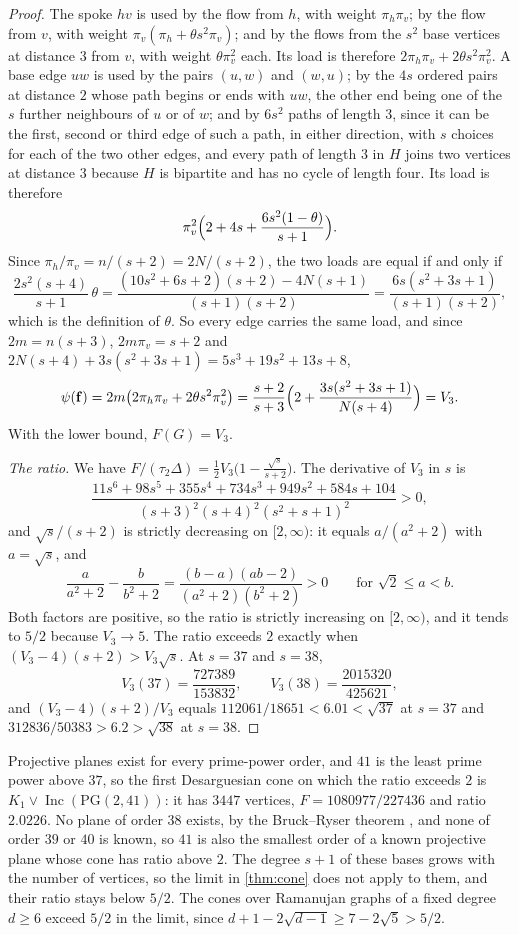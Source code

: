 \documentclass[11pt]{amsart}
\theoremstyle{definition}
\newcommand{\bfF}{\mathbf{f}}
\newcommand{\PG}{\mathrm{PG}}
\DeclareMathOperator{\Inc}{Inc}
\begin{document}
\begin{proof}
The spoke $hv$ is used by the flow from $h$, with weight $\pi_h\pi_v$; by the flow from $v$, with weight $\pi_v(\pi_h+\theta s^2\pi_v)$; and by the flows from the $s^2$ base vertices at distance $3$ from $v$, with weight $\theta\pi_v^2$ each. Its load is therefore $2\pi_h\pi_v+2\theta s^2\pi_v^2$. A base edge $uw$ is used by the pairs $(u,w)$ and $(w,u)$; by the $4s$ ordered pairs at distance $2$ whose path begins or ends with $uw$, the other end being one of the $s$ further neighbours of $u$ or of $w$; and by $6s^2$ paths of length $3$, since it can be the first, second or third edge of such a path, in either direction, with $s$ choices for each of the two other edges, and every path of length $3$ in $H$ joins two vertices at distance $3$ because $H$ is bipartite and has no cycle of length four. Its load is therefore
\[
\pi_v^2\Bigl(2+4s+\frac{6s^2(1-\theta)}{s+1}\Bigr).
\]
Since $\pi_h/\pi_v=n/(s+2)=2N/(s+2)$, the two loads are equal if and only if
\[
\frac{2s^2(s+4)}{s+1}\,\theta=\frac{(10s^2+6s+2)(s+2)-4N(s+1)}{(s+1)(s+2)}=\frac{6s(s^2+3s+1)}{(s+1)(s+2)},
\]
which is the definition of $\theta$. So every edge carries the same load, and since $2m=n(s+3)$, $2m\pi_v=s+2$ and $2N(s+4)+3s(s^2+3s+1)=5s^3+19s^2+13s+8$,
\[
\psi(\bfF)=2m\bigl(2\pi_h\pi_v+2\theta s^2\pi_v^2\bigr)=\frac{s+2}{s+3}\Bigl(2+\frac{3s(s^2+3s+1)}{N(s+4)}\Bigr)=V_3 .
\]
With the lower bound, $F(G)=V_3$.

\emph{The ratio.} We have $F/(\tau_2\Delta)=\frac12V_3\bigl(1-\frac{\sqrt s}{s+2}\bigr)$. The derivative of $V_3$ in $s$ is
\[
\frac{11s^6+98s^5+355s^4+734s^3+949s^2+584s+104}{(s+3)^2(s+4)^2(s^2+s+1)^2}>0,
\]
and $\sqrt s/(s+2)$ is strictly decreasing on $[2,\infty)$: it equals $a/(a^2+2)$ with $a=\sqrt s$, and
\[
\frac a{a^2+2}-\frac b{b^2+2}=\frac{(b-a)(ab-2)}{(a^2+2)(b^2+2)}>0\qquad\text{for }\sqrt2\le a<b .
\] Both factors are positive, so the ratio is strictly increasing on $[2,\infty)$, and it tends to $5/2$ because $V_3\to5$. The ratio exceeds $2$ exactly when $(V_3-4)(s+2)>V_3\sqrt s$. At $s=37$ and $s=38$,
\[
V_3(37)=\frac{727389}{153832},\qquad V_3(38)=\frac{2015320}{425621},
\]
and $(V_3-4)(s+2)/V_3$ equals $112061/18651<6.01<\sqrt{37}$ at $s=37$ and $312836/50383>6.2>\sqrt{38}$ at $s=38$.
\end{proof}

Projective planes exist for every prime-power order, and $41$ is the least prime power above $37$, so the first Desarguesian cone on which the ratio exceeds $2$ is $K_1\vee\Inc(\PG(2,41))$: it has $3447$ vertices, $F=1080977/227436$ and ratio $2.0226$. No plane of order $38$ exists, by the Bruck--Ryser theorem \cite{BR}, and none of order $39$ or $40$ is known, so $41$ is also the smallest order of a known projective plane whose cone has ratio above $2$. The degree $s+1$ of these bases grows with the number of vertices, so the limit in \cref{thm:cone} does not apply to them, and their ratio stays below $5/2$. The cones over Ramanujan graphs of a fixed degree $d\ge6$ exceed $5/2$ in the limit, since $d+1-2\sqrt{d-1}\ge7-2\sqrt5>5/2$.
\end{document}
